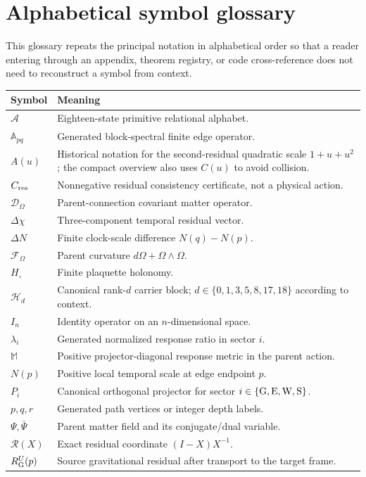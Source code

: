 \documentclass[11pt]{article}
\numberwithin{equation}{section}
\theoremstyle{remark}
\begin{document}
\clearpage
\section{Alphabetical symbol glossary}
\label{supp:app:symbols}
This glossary repeats the principal notation in alphabetical order so that a reader entering through an appendix, theorem registry, or code cross-reference does not need to reconstruct a symbol from context.
\begin{longtable}{p{2.4cm}p{11.8cm}}
\toprule Symbol&Meaning\\\midrule\endhead
$\mathcal A$&Eighteen-state primitive relational alphabet.\\
$\mathbb A_{pq}$&Generated block-spectral finite edge operator.\\
$A(u)$&Historical notation for the second-residual quadratic scale $1+u+u^2$; the compact overview also uses $C(u)$ to avoid collision.\\
$C_{\rm res}$&Nonnegative residual consistency certificate, not a physical action.\\
$\mathcal D_{\Omega}$&Parent-connection covariant matter operator.\\
$\Delta\chi$&Three-component temporal residual vector.\\
$\Delta N$&Finite clock-scale difference $N(q)-N(p)$.\\
$\mathcal F_{\Omega}$&Parent curvature $d\Omega+\Omega\wedge\Omega$.\\
$H_{\square}$&Finite plaquette holonomy.\\
$\mathcal H_d$&Canonical rank-$d$ carrier block; $d\in\{0,1,3,5,8,17,18\}$ according to context.\\
$I_n$&Identity operator on an $n$-dimensional space.\\
$\lambda_i$&Generated normalized response ratio in sector $i$.\\
$\mathbb M$&Positive projector-diagonal response metric in the parent action.\\
$N(p)$&Positive local temporal scale at edge endpoint $p$.\\
$P_i$&Canonical orthogonal projector for sector $i\in\{{\rm G,E,W,S}\}$.\\
$p,q,r$&Generated path vertices or integer depth labels.\\
$\Psi,\bar\Psi$&Parent matter field and its conjugate/dual variable.\\
$\mathcal R(X)$&Exact residual coordinate $(I-X)X^{-1}$.\\
$R_{\rm G}^{U}(p)$&Source gravitational residual after transport to the target frame.\\

\end{longtable}
\end{document}
